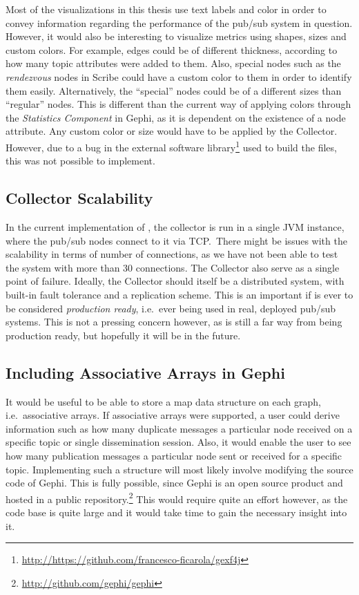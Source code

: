 Most of the visualizations in this thesis use text labels and color in
order to convey information regarding the performance of the pub/sub
system in question. However, it would also be interesting to visualize
metrics using shapes, sizes and custom colors. For example, edges could
be of different thickness, according to how many topic attributes were
added to them. Also, special nodes such as the \emph{rendezvous} nodes
in Scribe could have a custom color to them in order to identify them
easily. Alternatively, the ``special'' nodes could be of a different
sizes than ``regular'' nodes. This is different than the current way of
applying colors through the \emph{Statistics Component} in Gephi, as it
is dependent on the existence of a node attribute. Any custom color or
size would have to be applied by the Collector. However, due to a bug in
the external software
library\footnote{\url{http://https://github.com/francesco-ficarola/gexf4j}}
used to build the \gexf{} files, this was not possible to implement.


\subsection{Collector Scalability}

In the current implementation of \demo{}, the collector is run in a
single JVM instance, where the pub/sub nodes connect to it via TCP.\
There might be issues with the scalability in terms of number of
connections, as we have not been able to test the system with more than
30 connections. The Collector also serve as a single point of failure.
Ideally, the Collector should itself be a distributed system, with
built-in fault tolerance and a replication scheme. This is an important
if \demo{} is ever to be considered \emph{production ready}, i.e.\ ever
being used in real, deployed pub/sub systems. This is not a pressing
concern however, as \demo{} is still a far way from being production
ready, but hopefully it will be in the future.

\subsection{Including Associative Arrays in Gephi}

It would be useful to be able to store a map data structure on each
graph, i.e.\ associative arrays. If associative arrays were supported,
a user could derive information such as how many duplicate messages a
particular node received on a specific topic or single dissemination
session. Also, it would enable the user to see how many publication messages a
particular node sent or received for a specific topic. Implementing such
a structure will most likely involve modifying the source code of Gephi.
This is fully possible, since Gephi is an open source product and hosted
in a public repository.\footnote{\url{http://github.com/gephi/gephi}}
This would require quite an effort however, as the code base is quite
large and it would take time to gain the necessary insight into it.

